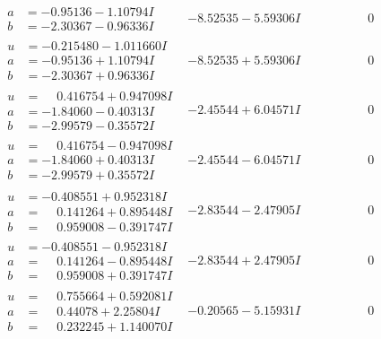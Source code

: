 \documentclass[1p]{elsarticle_modified}
\theoremstyle{definition}
\begin{document}
$$\begin{array}{c|c|c}
\begin{aligned}
a &= -0.95136 - 1.10794 I \\
b &= -2.30367 - 0.96336 I\end{aligned}
 & -8.52535 - 5.59306 I & \phantom{-0.000000 } 0 \\ \hline\begin{aligned}
u &= -0.215480 - 1.011660 I \\
a &= -0.95136 + 1.10794 I \\
b &= -2.30367 + 0.96336 I\end{aligned}
 & -8.52535 + 5.59306 I & \phantom{-0.000000 } 0 \\ \hline\begin{aligned}
u &= \phantom{-}0.416754 + 0.947098 I \\
a &= -1.84060 - 0.40313 I \\
b &= -2.99579 - 0.35572 I\end{aligned}
 & -2.45544 + 6.04571 I & \phantom{-0.000000 } 0 \\ \hline\begin{aligned}
u &= \phantom{-}0.416754 - 0.947098 I \\
a &= -1.84060 + 0.40313 I \\
b &= -2.99579 + 0.35572 I\end{aligned}
 & -2.45544 - 6.04571 I & \phantom{-0.000000 } 0 \\ \hline\begin{aligned}
u &= -0.408551 + 0.952318 I \\
a &= \phantom{-}0.141264 + 0.895448 I \\
b &= \phantom{-}0.959008 - 0.391747 I\end{aligned}
 & -2.83544 - 2.47905 I & \phantom{-0.000000 } 0 \\ \hline\begin{aligned}
u &= -0.408551 - 0.952318 I \\
a &= \phantom{-}0.141264 - 0.895448 I \\
b &= \phantom{-}0.959008 + 0.391747 I\end{aligned}
 & -2.83544 + 2.47905 I & \phantom{-0.000000 } 0 \\ \hline\begin{aligned}
u &= \phantom{-}0.755664 + 0.592081 I \\
a &= \phantom{-}0.44078 + 2.25804 I \\
b &= \phantom{-}0.232245 + 1.140070 I\end{aligned}
 & -0.20565 - 5.15931 I & \phantom{-0.000000 } 0 \\ \hline\begin{aligned}

\end{aligned}
\end{array}$$
\end{document}
